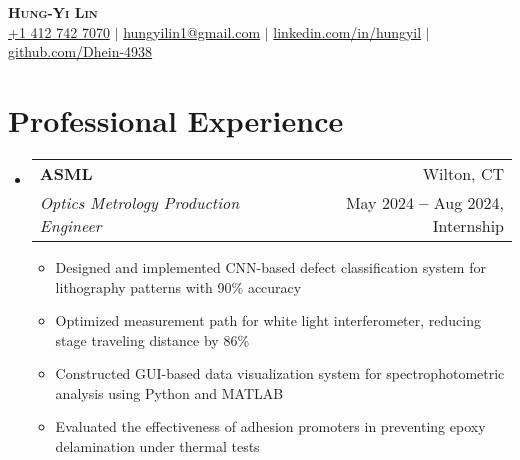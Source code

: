 \documentclass[a4paper,11pt]{article}
\makeatletter
\newcommand{\resumeItem}[1]{
  \item\small{
    {#1 \vspace{-1pt}}
  }
}
\newcommand{\resumeDoubleHeading}[4]{
  \vspace{-2pt}\item
    \begin{tabular*}{0.97\textwidth}[t]{l@{\extracolsep{\fill}}r}
        \textbf{#1} & #2 \\
        \textit{\small#3} & {\small #4} \\
    \end{tabular*}\vspace{-5pt}
}
\newcommand{\resumeSubHeadingListStart}{\begin{itemize}[leftmargin=0.15in, label={}]}
\newcommand{\resumeSubHeadingListEnd}{\end{itemize}}
\newcommand{\resumeItemListStart}{\begin{itemize}}
\newcommand{\resumeItemListEnd}{\end{itemize}\vspace{-5pt}}
\makeatother
\begin{document}

\begin{center}
    \textbf{\Huge \scshape Hung-Yi Lin} \\ \vspace{3pt}
    \small
    \faMobile \hspace{.5pt} \href{tel:14127427070}{+1 412 742 7070}
    $|$
    \faAt \hspace{.5pt} \href{mailto:hungyilin1@gmail.com}{hungyilin1@gmail.com}
    $|$
    \faLinkedinSquare \hspace{.5pt} \href{https://www.linkedin.com/in/hungyil}{linkedin.com/in/hungyil}
    $|$
    \faGithub \hspace{.5pt} \href{https://github.com/Dhein-4938}{github.com/Dhein-4938}
\end{center}


\section{Professional Experience}
  \vspace{3pt}
  \resumeSubHeadingListStart
    \resumeDoubleHeading
      {ASML}{Wilton, CT}
      {Optics Metrology Production Engineer}{May 2024 \textbf{--} Aug 2024, Internship}
        \resumeItemListStart
            \resumeItem{Designed and implemented CNN-based defect classification system for lithography patterns with 90\% accuracy}
            \resumeItem{Optimized measurement path for white light interferometer, reducing stage traveling distance by 86\%}
            \resumeItem{Constructed GUI-based data visualization system for spectrophotometric analysis using Python and MATLAB}
            \resumeItem{Evaluated the effectiveness of adhesion promoters in preventing epoxy delamination under thermal tests}
        \resumeItemListEnd
  \resumeSubHeadingListEnd

\end{document}
